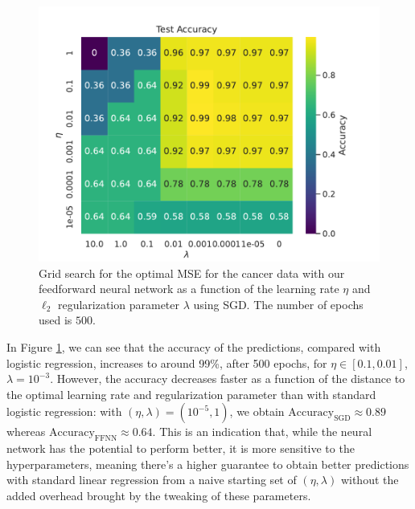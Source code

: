 \documentclass[aps,reprint,superscriptaddress,nofootinbib]{revtex4-2}
\begin{document}
\begin{figure}[htp]
    \centering
    \includegraphics[width=\linewidth]{part_d/2_grid_search_cancer.pdf}
    \caption{Grid search for the optimal MSE for the cancer data with our feedforward neural network as a function of the learning rate \(\eta\) and \(\ell_2\) regularization parameter \(\lambda\) using SGD. The number of epochs used is \(500\).}
    \label{fig:gs_nn_cancer}
\end{figure}

In Figure \ref{fig:gs_nn_cancer}, we can see that the accuracy of the predictions, compared with logistic regression, increases to around 99\%, after 500 epochs, for \(\eta \in \left[0.1, 0.01\right]\), \(\lambda = 10^{-3}\). However, the accuracy decreases faster as a function of the distance to the optimal learning rate and regularization parameter than with standard logistic regression: with \((\eta,\lambda)=(10^{-5},1)\), we obtain \(\text{Accuracy}_{\text{SGD}}\approx0.89\) whereas \(\text{Accuracy}_{\text{FFNN}}\approx0.64\). This is an indication that, while the neural network has the potential to perform better, it is more sensitive to the hyperparameters, meaning there's a higher guarantee to obtain better predictions with standard linear regression from a naive starting set of \((\eta,\lambda)\) without the added overhead brought by the tweaking of these parameters.
\end{document}
